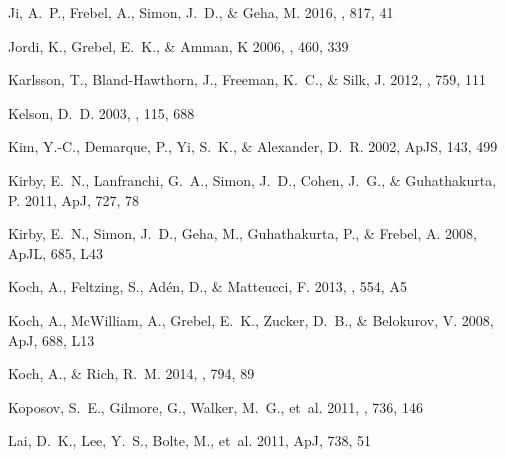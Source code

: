 \documentclass[]{emulateapj}
\begin{document}
\begin{thebibliography}{67}
{Ji}, A.~P., {Frebel}, A., {Simon}, J.~D., \& {Geha}, M. 2016{},
  \apj, 817, 41

{Jordi}, K., {Grebel}, E.~K., \& {Amman}, K 2006,
  \aap, 460, 339

{Karlsson}, T., {Bland-Hawthorn}, J., {Freeman}, K.~C., \& {Silk}, J. 2012,
  \apj, 759, 111

{Kelson}, D.~D. 2003, \pasp, 115, 688

{Kim}, Y.-C., {Demarque}, P., {Yi}, S.~K., \& {Alexander}, D.~R. 2002, ApJS,
  143, 499

{Kirby}, E.~N., {Lanfranchi}, G.~A., {Simon}, J.~D., {Cohen}, J.~G., \&
  {Guhathakurta}, P. 2011, ApJ, 727, 78

{Kirby}, E.~N., {Simon}, J.~D., {Geha}, M., {Guhathakurta}, P., \& {Frebel}, A.
  2008, ApJL, 685, L43

{Koch}, A., {Feltzing}, S., {Ad{\'e}n}, D., \& {Matteucci}, F. 2013, \aap, 554,
  A5

{Koch}, A., {McWilliam}, A., {Grebel}, E.~K., {Zucker}, D.~B., \& {Belokurov},
  V. 2008, ApJ, 688, L13

{Koch}, A., \& {Rich}, R.~M. 2014, \apj, 794, 89

{Koposov}, S.~E., {Gilmore}, G., {Walker}, M.~G.,  {et~al.} 2011, \apj, 736,
  146

{Lai}, D.~K., {Lee}, Y.~S., {Bolte}, M.,  {et~al.} 2011, ApJ, 738, 51


\end{thebibliography}
\end{document}
